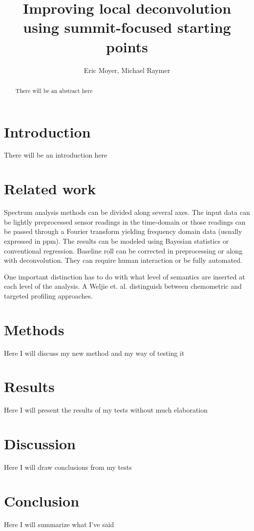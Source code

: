 \documentclass[10pt,letterpaper]{article}
\author{Eric Moyer, Michael Raymer}
\title{Improving local deconvolution using summit-focused starting points}
\begin{document}
\maketitle

\begin{abstract}
There will be an abstract here
\end{abstract}

\section{Introduction}
There will be an introduction here
\section{Related work}
Spectrum analysis methods can be divided along several axes. The input data can be lightly preprocessed sensor readings in the time-domain or those readings can be passed through a Fourier transform yielding frequency domain data (usually expressed in ppm). The results can be modeled using Bayesian statistics or conventional regression. Baseline roll can be corrected in preprocessing or along with deconvolution. They can require human interaction or be fully automated.

One important distinction has to do with what level of semantics are inserted at each level of the analysis. A Weljie et. al. distinguish between chemometric and targeted profiling approaches\cite{Weljie2006}. 
\section{Methods}
Here I will discuss my new method and my way of testing it
\section{Results}
Here I will present the results of my tests without much elaboration
\section{Discussion}
Here I will draw conclusions from my tests
\section{Conclusion}
Here I will summarize what I've said



\end{document}
